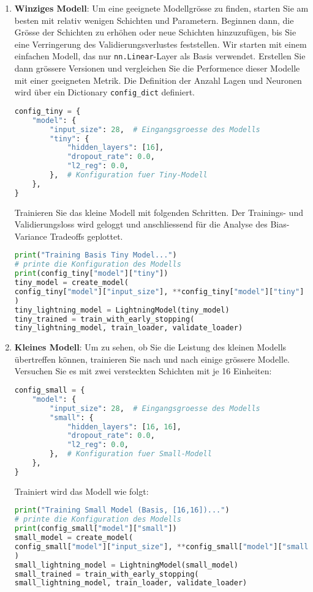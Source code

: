 \documentclass[11pt,a4paper,headinclude]{scrartcl}
\begin{document}
\begin{Aufgabe}
\begin{enumerate}
		
		
		\item \textbf{Winziges Modell}: Um eine geeignete Modellgrösse zu finden, starten Sie am besten mit relativ wenigen Schichten und Parametern. Beginnen dann, die Grösse der Schichten zu erhöhen oder neue Schichten hinzuzufügen, bis Sie eine Verringerung des Validierungsverlustes feststellen. Wir starten mit einem einfachen Modell, das nur \texttt{nn.Linear}-Layer als Basis verwendet. Erstellen Sie dann grössere Versionen und vergleichen Sie die Performence dieser Modelle mit einer geeigneten Metrik. Die Definition der Anzahl Lagen und Neuronen wird über ein Dictionary \texttt{config\_dict} definiert.
		
\begin{lstlisting}[language=Python]
config_tiny = {
	"model": {
		"input_size": 28,  # Eingangsgroesse des Modells
		"tiny": {
			"hidden_layers": [16],
			"dropout_rate": 0.0,
			"l2_reg": 0.0,
		},  # Konfiguration fuer Tiny-Modell
	},
}
\end{lstlisting}
		
Trainieren Sie das kleine Modell mit folgenden Schritten. Der Trainings- und Validierungsloss wird geloggt und anschliessend für die Analyse des Bias-Variance Tradeoffs geplottet.
\begin{lstlisting}[language=Python]
print("Training Basis Tiny Model...")
# printe die Konfiguration des Modells
print(config_tiny["model"]["tiny"])
tiny_model = create_model(
config_tiny["model"]["input_size"], **config_tiny["model"]["tiny"]
)
tiny_lightning_model = LightningModel(tiny_model)
tiny_trained = train_with_early_stopping(
tiny_lightning_model, train_loader, validate_loader)
\end{lstlisting}
		
		
\item \textbf{Kleines Modell}: Um zu sehen, ob Sie die Leistung des kleinen Modells übertreffen können, trainieren Sie nach und nach einige grössere Modelle. Versuchen Sie es mit zwei versteckten Schichten mit je 16 Einheiten:
		
\begin{lstlisting}[language=Python]
config_small = {
	"model": {
		"input_size": 28,  # Eingangsgroesse des Modells
		"small": {
			"hidden_layers": [16, 16],
			"dropout_rate": 0.0,
			"l2_reg": 0.0,
		},  # Konfiguration fuer Small-Modell
	},
}
\end{lstlisting}
		
Trainiert wird das Modell wie folgt:
\begin{lstlisting}[language=Python]
print("Training Small Model (Basis, [16,16])...")
# printe die Konfiguration des Modells
print(config_small["model"]["small"])
small_model = create_model(
config_small["model"]["input_size"], **config_small["model"]["small"]
)
small_lightning_model = LightningModel(small_model)
small_trained = train_with_early_stopping(
small_lightning_model, train_loader, validate_loader)
\end{lstlisting}
		

\end{enumerate}
\end{Aufgabe}
\end{document}
